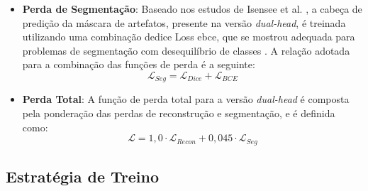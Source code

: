 \begin{itemize}
        \cite{zhaoLossFunctionsImage2017} utiliza filtragem Gaussiana em L1 para reduzir o impacto de ruído e favorecer a correção de artefatos, mas essa abordagem pode não ser ideal para tomografias computadorizadas, onde a precisão radiométrica é crucial. Portanto, neste trabalho, optou-se por utilizar a perda L1 direta sem filtragem gaussiana, garantindo máxima fidelidade na reconstrução dos valores de\acrfull{hu}, enquanto o\acrshort{ssim} continua a garantir a preservação estrutural.
        Essa combinação de função de perda é adotada para a arquitetura \textit{single-head} e também para a cabeça de reconstrução da arquitetura \textit{dual-head}. Dessa forma, garante-se que a ablação entre as duas versões seja justa, isolando o impacto da supervisão adicional da máscara.
    \item \textbf{Perda de Segmentação}: Baseado nos estudos de Isensee et al. \cite{isenseeNnUNetSelfadaptingFramework2018}, a cabeça de predição da máscara de artefatos, presente na versão \textit{dual-head}, é treinada utilizando uma combinação de\acrshort{dice} Loss e\acrfull{bce}, que se mostrou adequada para problemas de segmentação com desequilíbrio de classes \cite{taghanakiComboLossHandling2021}. A relação adotada para a combinação das funções de perda é a seguinte:
        \[
        \mathcal{L}_{Seg} = \mathcal{L}_{Dice} + \mathcal{L}_{BCE}
        \]
    \item \textbf{Perda Total}: A função de perda total para a versão \textit{dual-head} é composta pela ponderação das perdas de reconstrução e segmentação, e é definida como:
        \[
        \mathcal{L} = 1{,}0 \cdot \mathcal{L}_{Recon} + 0{,}045 \cdot \mathcal{L}_{Seg}
        \]
\end{itemize}

\subsection{Estratégia de Treino}

